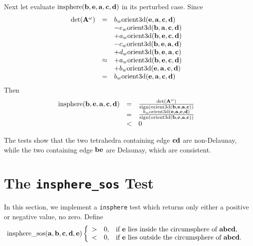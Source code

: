 Next let evaluate $\textrm{insphere}({\bf b},{\bf e},{\bf a},{\bf c},{\bf d})$ in its perturbed case. Since
\[
\begin{array}{rcl}
\textrm{det}({\bf A}^{\omega}) &=&
b_w\textrm{orient3d}({\bf e},{\bf a},{\bf c},{\bf d})\\
& & -e_w\textrm{orient3d}({\bf b},{\bf a},{\bf c},{\bf d})\\
& & +a_w\textrm{orient3d}({\bf b},{\bf e},{\bf c},{\bf d})\\
& & -c_w\textrm{orient3d}({\bf b},{\bf e},{\bf a},{\bf d})\\
& & +d_w\textrm{orient3d}({\bf b},{\bf e},{\bf a},{\bf c})\\
&\approx& +a_w\textrm{orient3d}({\bf b},{\bf e},{\bf c},{\bf d})\\
& & +b_w\textrm{orient3d}({\bf e},{\bf a},{\bf c},{\bf d})\\
&=& b_w\textrm{orient3d}({\bf e},{\bf a},{\bf c},{\bf d})
\end{array}
\]
Then
\[
\begin{array}{rcl}
\textrm{insphere}({\bf b},{\bf e},{\bf a},{\bf c},{\bf d}) &=&
\frac{\textrm{det}({\bf A}^{\omega})}{\textrm{sign}\left(\textrm{orient3d}({\bf b},{\bf e},{\bf a},{\bf c})\right)}\\
&=& \frac{b_w\textrm{orient3d}({\bf e},{\bf a},{\bf c},{\bf d})}{\textrm{sign}\left(\textrm{orient3d}({\bf b},{\bf e},{\bf a},{\bf c})\right)}\\
&<& 0
\end{array}
\]

The tests show that the two tetrahedra containing edge ${\bf cd}$ are non-Delaunay, while the two containing edge ${\bf be}$ are Delaunay, which are consistent. 

\section{The {\tt insphere\_sos} Test}

In this section, we implement a {\tt insphere} test which returns only either a positive or negative value, no zero. Define
\begin{equation}
  \textrm{insphere\_sos}({\bf a}, {\bf b}, {\bf c}, {\bf d}, {\bf e})
  \left\{
  \begin{array}{ccl}
  > & 0, & \textrm{if ${\bf e}$ lies inside the circumsphere of ${\bf abcd}$},\\
  < & 0, & \textrm{if ${\bf e}$ lies outside the circumsphere of ${\bf abcd}$}.  
  \end{array}
  \right.
\end{equation}

